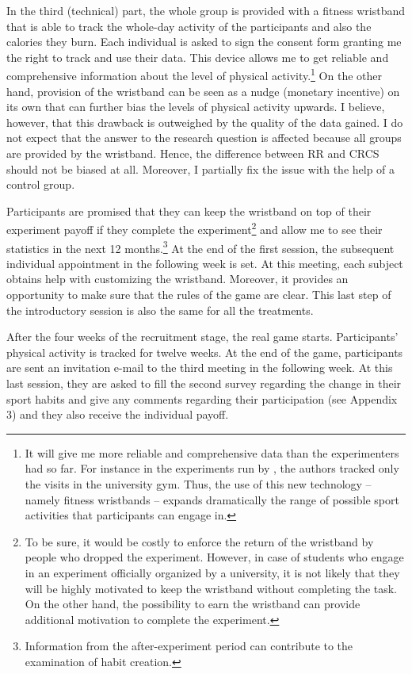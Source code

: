 \documentclass[12pt,english]{article}%
\begin{document}
In the third (technical) part, the whole group is provided with a fitness wristband that is able to track the whole-day activity of the participants and also the calories they burn. Each individual is asked to sign the consent form granting me the right to track and use their data. This device allows me to get reliable and comprehensive information about the level of physical activity.\footnote{ It will give me more reliable and comprehensive data than the experimenters had so far. For instance in the experiments run by \cite{charness2009}, the authors tracked only the visits in the university gym. Thus, the use of this new technology -- namely fitness wristbands -- expands dramatically the range of possible sport activities that participants can engage in.} On the other hand, provision of the wristband can be seen as a nudge (monetary incentive) on its own that can further bias the levels of physical activity upwards. I believe, however, that this drawback is outweighed by the quality of the data gained. I do not expect that the answer to the research question is affected because all groups are provided by the wristband. Hence, the difference between RR and CRCS should not be biased at all. Moreover, I partially fix the issue with the help of a control group. 

Participants are promised that they can keep the wristband on top of their experiment payoff if they complete the experiment\footnote{
To be sure, it would be costly to enforce the return of the wristband by people who dropped the experiment. However, in case of students who engage in an experiment officially organized by a university, it is not likely that they will be highly motivated to keep the wristband without completing the task. On the other hand, the possibility to earn the wristband can provide additional motivation to complete the experiment.} and allow me to see their statistics in the next 12 months.\footnote{Information from the after-experiment period can contribute to the examination of habit creation.} At the end of the first session, the subsequent individual appointment in the following week is set. At this meeting, each subject obtains help with customizing the wristband. Moreover, it provides an opportunity to make sure that the rules of the game are clear. This last step of the introductory session is also the same for all the treatments.

After the four weeks of the recruitment stage, the real game starts. Participants' physical activity is tracked for twelve weeks. At the end of the game, participants are sent an invitation e-mail to the third meeting in the following week. At this last session, they are asked to fill the second survey regarding the change in their sport habits and give any comments regarding their participation (see Appendix 3) and they also receive the individual payoff.
\end{document}
